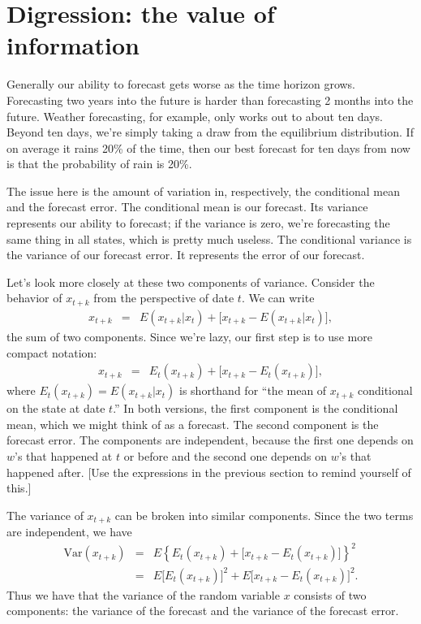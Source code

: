\documentclass[11pt]{article}
\begin{document}
\section{Digression: the value of information}


Generally our ability to forecast gets worse as the time horizon grows.
Forecasting two years into the future is harder than forecasting 2 months into the future.
Weather forecasting, for example, only works out to about ten days.  Beyond ten days,
we're simply taking a draw from the equilibrium distribution.
If on average it rains 20\% of the time, then our best forecast for ten days from now
is that the probability of rain is 20\%.

The issue here is the amount of variation in, respectively,
the conditional mean and the forecast error.
The conditional mean is our forecast.
Its variance represents our ability to forecast;
if the variance is zero, we're forecasting the same thing in all states, which is pretty much useless.
The conditional variance is the variance of our forecast error.
It represents the error of our forecast.


Let's look more closely at these two components of variance.
Consider the behavior of $x_{t+k}$ from the perspective of date $t$.
We can write
\begin{eqnarray*}
    x_{t+k} &=& E (x_{t+k} | x_t ) + \big[ x_{t+k} - E (x_{t+k} | x_t )\big] ,
\end{eqnarray*}
the sum of two components.
Since we're lazy, our first step is to use more compact notation:
\begin{eqnarray*}
    x_{t+k} &=& E_t (x_{t+k}) + \big[ x_{t+k} - E_t (x_{t+k})\big] ,
\end{eqnarray*}
where $ E_t (x_{t+k}) = E (x_{t+k} | x_t )$ is shorthand for
``the mean of $x_{t+k}$ conditional on the state at date $t$.''
In both versions, the first component is the conditional mean,
which we might think of as a forecast.
The second component is the forecast error.
The components are independent,
because the first one depends on $w$'s that happened at $t$ or before
and the second one depends on $w$'s that happened after.
[Use the expressions in the previous section to remind yourself of this.]

The variance of $x_{t+k}$ can be broken into similar
components.
Since the two terms are independent, we have
\begin{eqnarray*}
    \mbox{Var}(x_{t+k}) &=& E \left\{ E_t (x_{t+k}) + \big[ x_{t+k} - E_t (x_{t+k})\big]\right\}^2 \\
        &=& E \big[ E_t (x_{t+k}) \big]^2 + E \big[ x_{t+k} - E_t (x_{t+k})\big]^2 .
\end{eqnarray*}
Thus we have that the variance of the random variable $x$ consists of two components:
the variance of the forecast and the variance of the forecast error.
\end{document}
